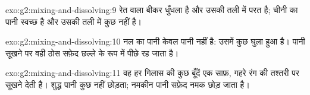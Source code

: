 \begin{solution}{exo:g2:mixing-and-dissolving:9}
रेत वाला बीकर धुँधला है और उसकी तली में परत है; चीनी का पानी स्वच्छ है
और उसकी तली में कुछ नहीं है।
\end{solution}

\begin{solution}{exo:g2:mixing-and-dissolving:10}
नल का पानी केवल पानी नहीं है: उसमें कुछ घुला हुआ है। पानी सूखने पर
वही ठोस सफ़ेद छल्ले के रूप में पीछे रह जाता है।
\end{solution}

\begin{solution}{exo:g2:mixing-and-dissolving:11}
वह हर गिलास की कुछ बूँदें एक साफ़, गहरे रंग की तश्तरी पर सूखने देती है।
शुद्ध पानी कुछ नहीं छोड़ता; नमकीन पानी सफ़ेद नमक छोड़ जाता है।
\end{solution}
